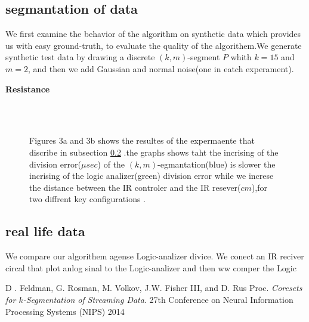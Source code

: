 \documentclass{vldb}
\begin{document}
\subsection{segmantation of data}
We first examine the behavior of the algorithm on synthetic data which provides us with
easy ground-truth, to evaluate the quality of the algorithem.We generate synthetic test data by drawing a discrete $(k,m)$-segment $P$ whith $k=15$ and $m=2$, and then we add Gaussian and normal noise(one in eatch experament).

\textbf{Resistance}

\begin{figure}[H]
\centering
{}  \\
\\

\caption{Figures 3a and 3b shows the resultes of the expermaente that discribe in subsection \ref{IR} .the graphs shows taht the incrising of the division error($\mu sec$) of the $(k,m)$-egmantation(blue) is slower  the incrising of the logic analizer(green) division error while we increse the distance between the IR controler and the IR resever($cm$),for two diffrent key configurations .}
\end{figure}
\subsection{real life data}\label{IR}
We compare our algorithem agense Logic-analizer divice. We conect an IR reciver circal that plot anlog sinal to the Logic-analizer and then ww comper the Logic 
\medskip

\begin{thebibliography}{9}
D . Feldman, G. Rosman, M. Volkov, J.W. Fisher III, and D. Rus
Proc. 
\textit{Coresets for $k$-Segmentation of Streaming Data}. 
27th Conference on Neural Information Processing Systems (NIPS) 2014
 
\end{thebibliography}
\end{document}

